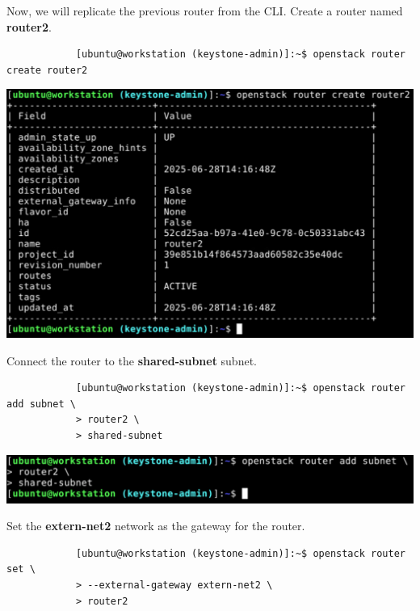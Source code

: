 \documentclass[letterpaper, 12pt]{article}
\begin{document}
\begin{enumerate}
    \begin{labstep}
        Now, we will replicate the previous router from the CLI.
        Create a router named \textbf{router2}.
        \begin{lstlisting}
            [ubuntu@workstation (keystone-admin)]:~$ openstack router create router2
        \end{lstlisting}

        \begin{center}
            \includegraphics[width=\linewidth]{images/part2/step13.png}
        \end{center}
    \end{labstep}

    \begin{labstep}
        Connect the router to the \textbf{shared-subnet} subnet.
        \begin{lstlisting}
            [ubuntu@workstation (keystone-admin)]:~$ openstack router add subnet \
            > router2 \
            > shared-subnet
        \end{lstlisting}

        \begin{center}
            \includegraphics[width=\linewidth]{images/part2/step14.png}
        \end{center}
    \end{labstep}

    \begin{labstep}
        Set the \textbf{extern-net2} network as the gateway for the router.
        \begin{lstlisting}
            [ubuntu@workstation (keystone-admin)]:~$ openstack router set \
            > --external-gateway extern-net2 \
            > router2
        \end{lstlisting}


\end{labstep}
\end{enumerate}
\end{document}
